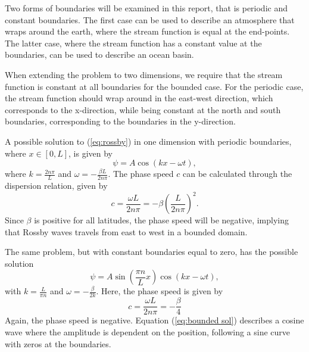 Two forms of boundaries will be examined in this report, that is periodic and constant boundaries. The first case can be used to describe an atmosphere that wraps around the earth, where the stream function is equal at the end-points. The latter case, where the stream function has a constant value at the boundaries, can be used to describe an ocean basin.

When extending the problem to two dimensions, we require that the stream function is constant at all boundaries for the bounded case. For the periodic case, the stream function should wrap around in the east-west direction, which corresponds to the x-direction, while being constant at the north and south boundaries, corresponding to the boundaries in the y-direction.   

A possible solution to (\ref{eq:rossby}) in one dimension with periodic boundaries, where $x \in \left[0,L \right] $, is given by 
\begin{equation}\label{eq:periodic sol}
	\psi = A\cos{\left(kx-\omega t\right)},
\end{equation}
where $k=\frac{2n\pi}{L}$ and $\omega = - \frac{\beta L}{2n\pi}$. The phase speed $c$ can be calculated through the dispersion relation, given by
\begin{equation}
	c = \frac{\omega L}{2n\pi}=-\beta \left(\frac{L}{2n\pi}\right)^2.
\end{equation}
Since $\beta$ is positive for all latitudes, the phase speed will be negative, implying that Rossby waves travels from east to west in a bounded domain. 

The same problem, but with constant boundaries equal to zero, has the possible solution 
\begin{equation}\label{eq:bounded sol}
	\psi = A\sin\left(\frac{\pi n}{L}x\right)\cos\left(kx-\omega t\right),
\end{equation}
with $k = \frac{L}{\pi n}$ and $\omega = - \frac{\beta}{2k}$. Here, the phase speed is given by 
\begin{equation}
	\label{eq:phasespeed}
	c = \frac{\omega L}{2n\pi} = - \frac{\beta}{4}
\end{equation}
Again, the phase speed is negative. Equation (\ref{eq:bounded sol}) describes a cosine wave where the amplitude is dependent on the position, following a sine curve with zeros at the boundaries.
  

